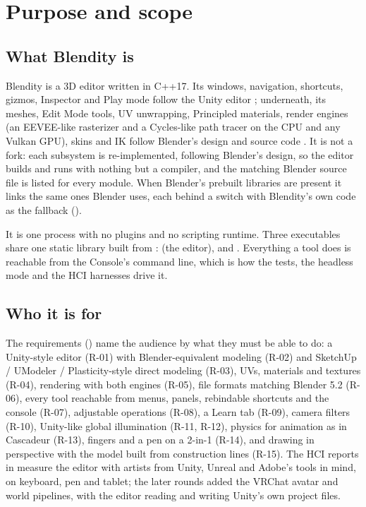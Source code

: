 \chapter{Purpose and scope}
\label{ch:purpose}

\section{What Blendity is}
Blendity is a 3D editor written in C++17. Its windows, navigation, shortcuts, gizmos, Inspector and Play mode follow
the Unity editor \cite{UnityManual2026}; underneath, its meshes, Edit Mode tools, UV unwrapping, Principled materials,
render engines (an EEVEE-like rasterizer and a Cycles-like path tracer on the CPU and any Vulkan GPU), skins and IK
follow Blender's design and source code \cite{Blender2026}. It is not a fork: each subsystem is re-implemented, following
Blender's design, so the editor builds and runs with nothing but a compiler, and the matching Blender source file is
listed for every module. When Blender's prebuilt libraries are present it links the same ones Blender uses, each behind
a switch with Blendity's own code as the fallback ().

It is one process with no plugins and no scripting runtime. Three executables share one static library built from
:  (the editor),  and . Everything a tool does is
reachable from the Console's command line, which is how the tests, the headless mode and the HCI harnesses drive it.

\section{Who it is for}
The requirements () name the audience by what they must be able to do: a Unity-style editor
(R-01) with Blender-equivalent modeling (R-02) and SketchUp / UModeler / Plasticity-style direct modeling (R-03), UVs,
materials and textures (R-04), rendering with both engines (R-05), file formats matching Blender 5.2 (R-06), every tool
reachable from menus, panels, rebindable shortcuts and the console (R-07), adjustable operations (R-08), a Learn tab
(R-09), camera filters (R-10), Unity-like global illumination (R-11, R-12), physics for animation as in Cascadeur
(R-13), fingers and a pen on a 2-in-1 (R-14), and drawing in perspective with the model built from construction lines
(R-15). The HCI reports in  measure the editor with artists from Unity, Unreal and Adobe's tools in
mind, on keyboard, pen and tablet; the later rounds added the VRChat avatar and world pipelines, with the editor
reading and writing Unity's own project files.


